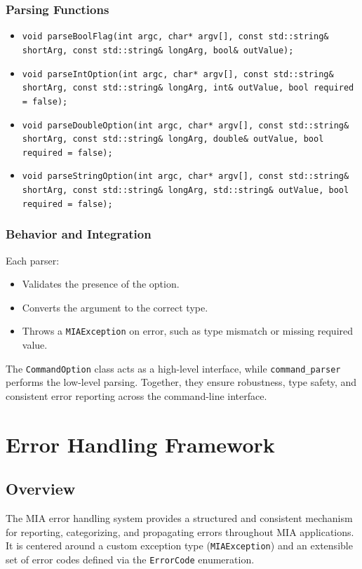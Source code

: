 \subsubsection*{Parsing Functions}
\begin{itemize}\itemsep0em
	\item \texttt{void parseBoolFlag(int argc, char* argv[], const std::string\& shortArg, const std::string\& longArg, bool\& outValue);}
	\item \texttt{void parseIntOption(int argc, char* argv[], const std::string\& shortArg, const std::string\& longArg, int\& outValue, bool required = false);}
	\item \texttt{void parseDoubleOption(int argc, char* argv[], const std::string\& shortArg, const std::string\& longArg, double\& outValue, bool required = false);}
	\item \texttt{void parseStringOption(int argc, char* argv[], const std::string\& shortArg, const std::string\& longArg, std::string\& outValue, bool required = false);}
\end{itemize}

\subsubsection*{Behavior and Integration}
Each parser:
\begin{itemize}\itemsep0em
	\item Validates the presence of the option.
	\item Converts the argument to the correct type.
	\item Throws a \texttt{MIAException} on error, such as type mismatch or missing required value.
\end{itemize}
The \texttt{CommandOption} class acts as a high-level interface, while \texttt{command\_parser} performs the low-level parsing. Together, they ensure robustness, type safety, and consistent error reporting across the command-line interface.














\section{Error Handling Framework}
\label{section:error_handling}

\subsection*{Overview}
The MIA error handling system provides a structured and consistent mechanism for reporting, categorizing, and propagating errors throughout MIA applications. It is centered around a custom exception type (\texttt{MIAException}) and an extensible set of error codes defined via the \texttt{ErrorCode} enumeration.

